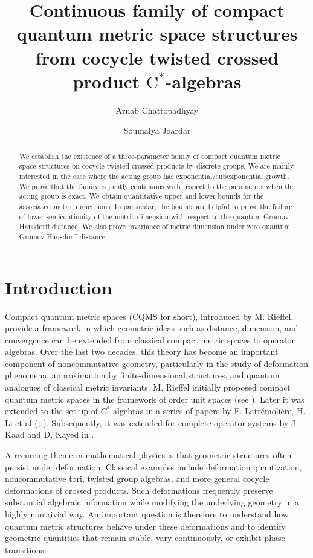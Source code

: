 \documentclass[a4paper,11pt,reqno]{amsart}
\title[Continuous family of compact quantum metric spaces]{Continuous family of compact quantum metric space structures from cocycle twisted crossed product $\textrm{C}^{\ast}$-algebras}
\author[A. Chattopadhyay]{Arnab Chattopadhyay}
\author[S. Joardar]{Soumalya Joardar}
\theoremstyle{plain}
\theoremstyle{mainthmstyle}
\theoremstyle{named}
\numberwithin{equation}{section}
\begin{document}
\begin{abstract}
    We establish the existence of a three-parameter family of compact quantum metric space structures on cocycle twisted crossed products by discrete groups. We are mainly interested in the case where the acting group has exponential/subexponential growth. We prove that the family is jointly continuous with respect to the parameters when the acting group is exact. We obtain quantitative upper and lower bounds for the associated metric dimensions. In particular, the bounds are helpful to prove the failure of lower semicontinuity of the metric dimension with respect to the quantum Gromov-Hausdorff distance. We also prove invariance of metric dimension under zero quantum Gromov-Hausdorff distance. 
\end{abstract}
\maketitle
\section{Introduction}
Compact quantum metric spaces (CQMS for short), introduced by M. Rieffel, provide a framework in which geometric ideas such as distance, dimension, and convergence can be extended from classical compact metric spaces to operator algebras.  Over the last two decades, this theory has become an important component of noncommutative geometry, particularly in the study of deformation phenomena, approximation by finite-dimensional structures, and quantum analogues of classical metric invariants. M. Rieffel initially proposed compact quantum metric spaces in the framework of order unit spaces (see \cites{Rieffel-Metric, Rieffel-Gromov, Rieffel-Sphere}). Later it was extended to the set up of $C^{\ast}$-algebras in a series of papers by F. Latr\'emoli\`ere, H. Li et al (\cites{Latre-Prop1, Latre-Prop2, Latre-Prop3}; \cites{Hanfeng-CQMS, Hanfeng-qGH}). Subsequently, it was extended for complete operator systems by J. Kaad and D. Kayed in \cite{Kaad-Kyed}.

A recurring theme in mathematical physics is that geometric structures often persist under deformation. Classical examples include deformation quantization, noncommutative tori, twisted group algebras, and more general cocycle deformations of crossed products. Such deformations frequently preserve substantial algebraic information while modifying the underlying geometry in a highly nontrivial way. An important question is therefore to understand how quantum metric structures behave under these deformations and to identify geometric quantities that remain stable, vary continuously, or exhibit phase transitions.
\end{document}
